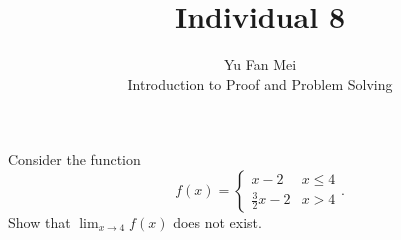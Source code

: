 \documentclass[12pt]{article}
\newenvironment{problem}[2][Problem]{\begin{trivlist}
\item[\hskip \labelsep {\bfseries #1}\hskip \labelsep {\bfseries #2.}]}{\end{trivlist}}
\begin{document}

\title{Individual 8}%
\author{Yu Fan Mei\\
	Introduction to Proof and Problem Solving} %

\maketitle

\begin{problem}{1}
    Consider the function
    \begin{equation*}
    f(x) =
    \begin{cases}
    x - 2 & x \leq 4\\
    \frac{3}{2}x - 2 & x > 4
    \end{cases}.
    \end{equation*}
    Show that $\lim_{x\to 4} f(x)$ does not exist.
\end{problem}
\end{document}
